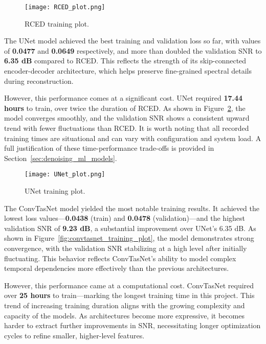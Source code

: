 \begin{figure}[H]
    \centering
    \texttt{[image: RCED\_plot.png]}
    \caption{\label{fig:rced_training_plot} RCED training plot.}
\end{figure}

The UNet model achieved the best training and validation loss so far, with values of \textbf{0.0477} and \textbf{0.0649} respectively, and more than doubled the validation SNR to \textbf{6.35 dB} compared to RCED. This reflects the strength of its skip-connected encoder-decoder architecture, which helps preserve fine-grained spectral details during reconstruction.

However, this performance comes at a significant cost. UNet required \textbf{17.44 hours} to train, over twice the duration of RCED. As shown in Figure~\ref{fig:unet_training_plot}, the model converges smoothly, and the validation SNR shows a consistent upward trend with fewer fluctuations than RCED. It is worth noting that all recorded training times are situational and can vary with configuration and system load. A full justification of these time-performance trade-offs is provided in Section~\ref{sec:denoising_ml_models}.

\begin{figure}[H]
    \centering
    \texttt{[image: UNet\_plot.png]}
    \caption{\label{fig:unet_training_plot} UNet training plot.}
\end{figure}

The ConvTasNet model yielded the most notable training results. It achieved the lowest loss values—\textbf{0.0438} (train) and \textbf{0.0478} (validation)—and the highest validation SNR of \textbf{9.23 dB}, a substantial improvement over UNet’s 6.35 dB. As shown in Figure~\ref{fig:convtasnet_training_plot}, the model demonstrates strong convergence, with the validation SNR stabilizing at a high level after initially fluctuating. This behavior reflects ConvTasNet’s ability to model complex temporal dependencies more effectively than the previous architectures.

However, this performance came at a computational cost. ConvTasNet required over \textbf{25 hours} to train—marking the longest training time in this project. This trend of increasing training duration aligns with the growing complexity and capacity of the models. As architectures become more expressive, it becomes harder to extract further improvements in SNR, necessitating longer optimization cycles to refine smaller, higher-level features.

